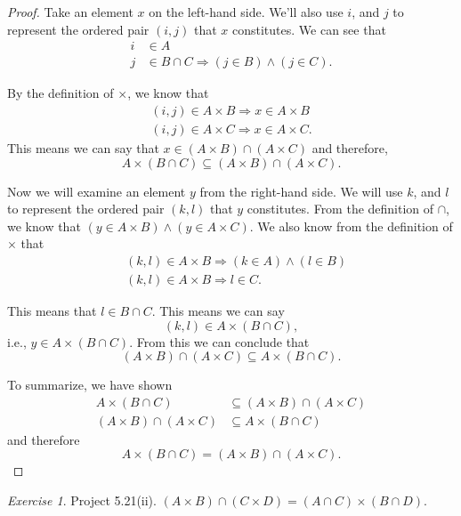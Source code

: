 \documentclass[12pt,oneside]{amsart}
\theoremstyle{remark}
\newtheorem{exer}{Exercise}
\begin{document}
\begin{proof}
Take an element $x$ on the left-hand side. We'll also use $i$, and $j$ to represent the ordered pair $(i, j)$ that $x$ constitutes. We can see that
\begin{align*}
i &\in A \tag{definition of $\times$} \\
j &\in B \cap C \Rightarrow (j \in B) \wedge (j \in C). \tag{definition of $\cap$}
\end{align*}

By the definition of $\times$, we know that
\begin{align*}
(i, j) \in A \times B \Rightarrow x \in A \times B \\
(i, j) \in A \times C \Rightarrow x \in A \times C.
\end{align*} This means we can say that $x \in (A \times B) \cap (A \times C)$ and therefore, \[ A \times (B \cap C) \subseteq (A \times B) \cap (A \times C). \]

Now we will examine an element $y$ from the right-hand side. We will use $k$, and $l$ to represent the ordered pair $(k, l)$ that $y$ constitutes. From the definition of $\cap$, we know that $(y \in A \times B) \wedge (y \in A \times C)$. We also know from the definition of $\times$ that
\begin{align*}
&(k, l) \in A \times B \Rightarrow (k \in A) \wedge (l \in B) \\
&(k, l) \in A \times B \Rightarrow l \in C.
\end{align*}

This means that $l \in B \cap C$. This means we can say \[ (k, l) \in A \times (B \cap C), \] i.e., $y \in A \times (B \cap C)$. From this we can conclude that \[ (A \times B) \cap (A \times C) \subseteq A \times (B \cap C). \]

To summarize, we have shown
\begin{align*}
A \times (B \cap C) &\subseteq (A \times B) \cap (A \times C) \\
(A \times B) \cap (A \times C) &\subseteq A \times (B \cap C)
\end{align*} and therefore \[ A \times (B \cap C) = (A \times B) \cap (A \times C). \]
\end{proof}

%
%
%
%
\newpage
\begin{exer}
Project 5.21(ii). $(A \times B) \cap (C \times D) = (A \cap C) \times (B \cap D).$ %
\end{exer}
\end{document}
